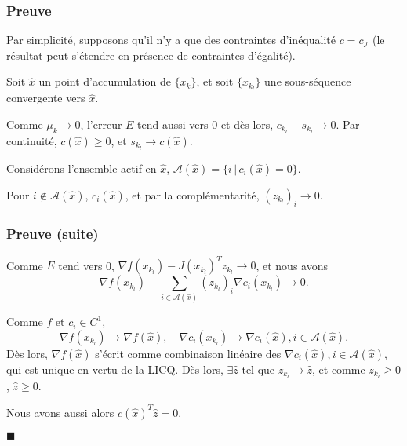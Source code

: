 \documentclass[usepdftitle=false]{beamer}
\def\cA{\mathcal{A}}
\def\cI{\mathcal{I}}
\begin{document}
\begin{frame}
\frametitle{Preuve}

Par simplicité, supposons qu'il n'y a que des contraintes d'inéqualité $c = c_{\cI}$ (le résultat peut s'étendre en présence de contraintes d'égalité).

\mbox{}

Soit $\hat{x}$ un point d'accumulation de $\{ x_k \}$, et soit $\{ x_{k_l} \}$ une sous-séquence convergente vers $\hat{x}$.

\mbox{}

Comme $\mu_k \rightarrow 0$, l'erreur $E$ tend aussi vers 0 et dès lors, $c_{k_l} - s_{k_l} \rightarrow 0$.
Par continuité, $c(\hat{x}) \geq 0$, et $s_{k_l} \rightarrow c(\hat{x})$.

\mbox{}

Considérons l'ensemble actif en $\hat{x}$, $\cA(\hat{x}) = \{ i \,|\, c_i(\hat{x}) = 0 \}$.

\mbox{}

Pour $i \notin \cA(\hat{x})$, $c_i(\hat{x})$, et par la complémentarité, $(z_{k_l})_i \rightarrow 0$.

\end{frame}

\begin{frame}
\frametitle{Preuve (suite)}

Comme $E$ tend vers 0, $\nabla f(x_{k_l}) - J(x_{k_l})^T z_{k_l} \rightarrow 0$, et nous avons
$$
\nabla f(x_{k_l}) - \sum_{i \in \cA(\hat{x})} (z_{k_l})_i \nabla c_i(x_{k_l}) \rightarrow 0.
$$

\mbox{}

Comme $f$ et $c_i \in C^1$, 
$$
\nabla f(x_{k_l}) \rightarrow \nabla f(\hat{x}), \quad
\nabla c_i(x_{k_l}) \rightarrow \nabla c_i(\hat{x}), i \in \cA(\hat{x}).
$$
Dès lors, $\nabla f(\hat{x})$ s'écrit comme combinaison linéaire des $\nabla c_i(\hat{x}), i \in \cA(\hat{x})$, qui est unique en vertu de la LICQ. Dès lors, $\exists \hat{z}$ tel que $z_{k_l} \rightarrow \hat{z}$, et comme $z_{k_l} \geq 0$, $\hat{z} \geq 0$.

\mbox{}

Nous avons aussi alors $c(\hat{x})^T \hat{z} = 0$.

\begin{flushright}
$\blacksquare$
\end{flushright}

\end{frame}
\end{document}
